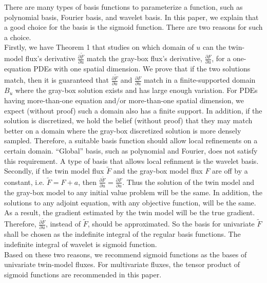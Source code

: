 \documentclass[a4paper,twoside]{article}
\begin{document}
There are many types of basis functions to parameterize a function, such as polynomial basis,
Fourier basis, and wavelet basis.
In this paper, we explain that a good choice for the basis is the sigmoid function.
There are two reasons for such a choice.\\

Firstly, we have Theorem 1 that studies on which domain of $u$ 
can the twin-model flux's derivative $\frac{\partial \tilde{F}}{\partial u}$ match the gray-box
flux's derivative, $\frac{\partial {F}}{\partial u}$, for a one-equation PDEs with one spatial
dimension. We prove that if the two solutions match, 
then it is guaranteed that  $\frac{\partial \tilde{F}}{\partial u}$  and
 $\frac{\partial {F}}{\partial u}$ match in a finite-supported domain
$B_u$ where the gray-box solution exists and has large enough variation. 
For PDEs having more-than-one equation and/or more-than-one spatial dimension,
we expect (without proof) such a domain also has a finite support.
In addition, if the solution is discretized, we hold the belief (without proof) that they may 
match better on a domain where the gray-box discretized solution is more densely sampled.
Therefore, a suitable basis function should allow local refinements on a certain domain. 
``Global'' basis, such as polynomial and Fourier,
does not satisfy this requirement.
A type of basis that allows local refinment is the wavelet basis.\\

Secondly, if the twin model flux $\tilde{F}$ and the gray-box model flux $F$
are off by a constant, i.e. $\tilde{F} = F+a$, then $\frac{\partial \tilde{F}}{\partial u}=
\frac{\partial {F}}{\partial u}$. Thus the solution of the twin model and the gray-box
model to any initial value problem will be the same. In addition, the solutions to any adjoint
equation, with any objective function, will be the same. As a result, the gradient estimated
by the twin model will be the true gradient. Therefore, $\frac{\partial \tilde{F}}{\partial u}$,
instead of $\tilde{F}$, should be approximated. So the basis for univariate $\tilde{F}$ shall be
chosen as the indefinite integral of the regular basis functions. 
The indefinite integral of wavelet is sigmoid function.\\

Based on these two reasons, we recommend sigmoid functions as the bases of univariate twin-model 
fluxes. For multivariate fluxes, the tensor product of sigmoid functions are recommended in this
paper.\\
\end{document}
